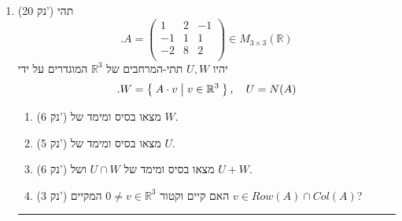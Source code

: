 \documentclass[12pt, a4paper]{article}
\newcommand{\cc}{\mathbb{C}}
\newcommand{\rr}{\mathbb{R}}
\newcommand{\points}[1]{(#1 נק') }
\begin{document}
\begin{enumerate}
\pagebreak

\newcommand{\thirdQ}{
\item\points{20}
תהי
$$.A=\begin{pmatrix}
1&2&-1\\
-1&1&1\\
-2&8&2\\
\end{pmatrix}
\in M_{3\times 3}(\rr)$$
יהיו
$U,W$
תתי-המרחבים של
$\rr^3$
המוגדרים על ידי
$$.W=\Set{A\cdot v | v\in \rr^3},\quad
U=N(A)
$$
\begin{enumerate}
\item\points{6}
מצאו בסיס ומימד של
$W$.
\item\points{5}
מצאו בסיס ומימד של
$U$.
\item\points{6}
מצאו בסיס ומימד של
$U\cap W$ ושל $U+W$.
\item
\points{3}
האם קיים וקטור
$0\neq v\in\rr^3$
המקיים
$v\in Row(A)\cap Col(A)$?
\end{enumerate}

}
\thirdQ

\noindent\rule{\textwidth-30pt}{0.4pt}
\newcommand{\forthQ}{
    \item \points{20}
    הסעיפים הבאים לא קשורים אחד לשני:
    \begin{enumerate}
        \item\points{10} 
        תהי $T:V\to W$ \ 
        העתקה לינארית
        ויהיו
        $v_1,v_2,v_3\in V$.
        
        הוכיחו כי אם
        $T(v_1),T(v_2),T(v_3)$
        בלתי תלויים לינארית (בת"ל),
        
        אז גם
        $v_1,v_2,v_3$
        בלתי תלויים לינארית (בת"ל).

        \ 
        
        \item\points{10} 
        תהי מטריצה $A\in M_{n\times n}(\cc)$ כך ש- $A^2=A$ ויהי
        $\lambda$
        ערך עצמי של $A$.

        הראו כי
        $\lambda=1$ או $\lambda = 0$.
    

\end{enumerate}}
\end{enumerate}
\end{document}
